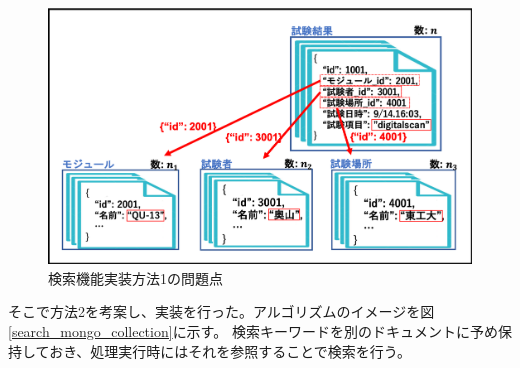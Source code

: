 \begin{figure}[bpt]
  \begin{center}
    \includegraphics[width=16cm]{search_python_list_problem}
  \caption[検索機能実装方法1の問題点]{検索機能実装方法1の問題点}
  \label{search_python_list_problem}
  \end{center}
\end{figure}

そこで方法2を考案し、実装を行った。アルゴリズムのイメージを図\ref{search_mongo_collection}に示す。
検索キーワードを別のドキュメントに予め保持しておき、処理実行時にはそれを参照することで検索を行う。

